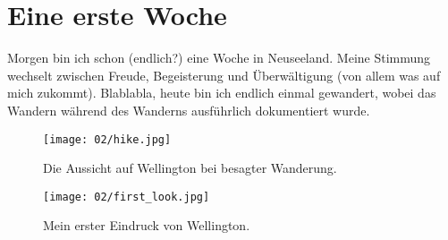 \chapter{Eine erste Woche}

Morgen bin ich schon (endlich?) eine Woche in Neuseeland. Meine
Stimmung wechselt zwischen Freude, Begeisterung und Überwältigung (von
allem was auf mich zukommt). Blablabla, heute bin ich endlich einmal
gewandert, wobei das Wandern während des Wanderns ausführlich
dokumentiert wurde.
\begin{figure}[h]
  \centering
  \texttt{[image: 02/hike.jpg]}
  \caption*{Die Aussicht auf Wellington bei besagter Wanderung.}
\end{figure}

\begin{figure}[h]
  \centering
  \texttt{[image: 02/first\_look.jpg]}
  \caption*{Mein erster Eindruck von Wellington.}
\end{figure}
